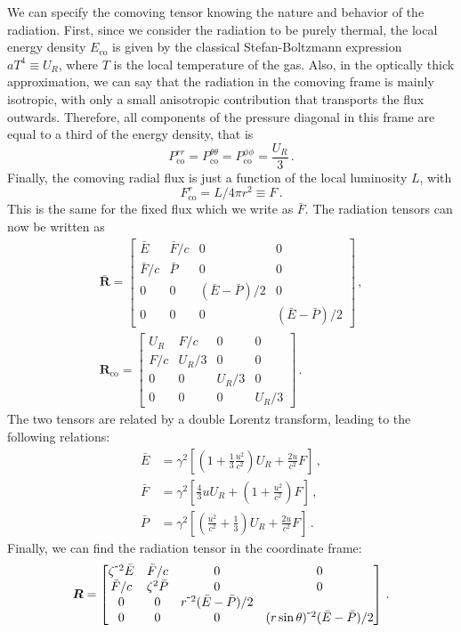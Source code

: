 \documentclass[../main.tex]{subfiles}
\begin{document}
We can specify the comoving tensor knowing the nature and behavior of the radiation.  First, since we consider the radiation to be purely thermal, the local energy density $E_\text{co}$ is given by the classical Stefan-Boltzmann expression $aT^4\equiv U_R$, where $T$ is the local temperature of the gas.  Also, in the optically thick approximation, we can say that the radiation in the comoving frame is mainly isotropic, with only a small anisotropic contribution that transports the flux outwards.  Therefore, all components of the pressure diagonal in this frame are equal to a third of the energy density, that is
\begin{equation}
    P^{rr}_\text{co}=P^{\theta\theta}_\text{co}=P^{\phi\phi}_\text{co}=\frac{U_R}{3} \,.
\end{equation}
Finally, the comoving radial flux is just a function of the local luminosity $L$, with
\begin{equation}
    F^r_\text{co}=L/4\pi r^2\equiv F\,.
\end{equation}
This is the same for the fixed flux which we write as $\bar{F}$. The radiation tensors can now be written as
\begin{gather}
\bm{\bar{R}}=\begin{bmatrix}\bar{E} & \bar{F}/c &0&0\\\bar{F}/c &\bar{P} &0&0\\0&0&(\bar{E}-\bar{P})/2&0\\0&0&0&(\bar{E}-\bar{P})/2\end{bmatrix}\,,
\\
\bm{R}_\text{co}=\begin{bmatrix}U_R & F/c&0&0\\F/c&U_R/3&0&0\\0&0&U_R/3&0\\0&0&0&U_R/3\end{bmatrix} \,.
\end{gather}  
The two tensors are related by a double Lorentz transform, leading to the following relations:
\begin{align}
    \bar{E}&=\gamma^2\left[\left(1+\frac{1}{3}\frac{u^2}{c^2}\right)U_R + \frac{2u}{c^2}F\right]\label{eq:E_frametransform}\,,\\
    \bar{F}&=\gamma^2\left[\frac{4}{3}uU_R + \left(1+\frac{u^2}{c^2}\right)F\right]\label{eq:F_frametransform}\,,\\
    \bar{P}&=\gamma^2\left[\left(\frac{u^2}{c^2}+\frac{1}{3}\right)U_R + \frac{2u}{c^2}F\right]\label{eq:P_frametransform} \,.
\end{align}
Finally, we can find the radiation tensor in the coordinate frame:
\begin{equation}\label{eq:coordinate_radstresstensor}
   \bm{R}=\begin{bmatrix}\zeta^{\-2}\bar{E}&\bar{F}/c&0&0\\\bar{F}/c&\zeta^2\bar{P}&0&0\\0&0&r^{\-2}(\bar{E}-\bar{P})/2\\0&0&0&(r\sin\theta)^{\-2}(\bar{E}-\bar{P})/2\end{bmatrix} \,.
\end{equation}
\end{document}
